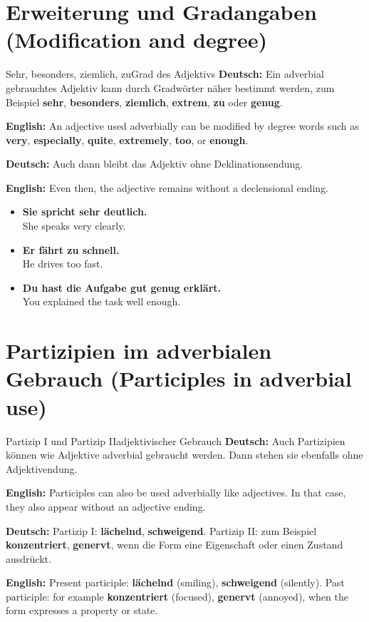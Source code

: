 \documentclass[a4paper,11pt]{article}
\newcommand{\GermanText}[1]{\textbf{Deutsch: }#1\par}
\newcommand{\EnglishText}[1]{{\small\color{SoftGray}\textbf{English: }#1\par}}
\newcommand{\ExampleItem}[2]{\item \textbf{#1}\\{\small\color{SoftGray}#2}}
\begin{document}
    \section{Erweiterung und Gradangaben \textnormal{(Modification and degree)}}

        \begin{grammarentry}{Sehr, besonders, ziemlich, zu}{Grad des Adjektivs}
            \GermanText{Ein adverbial gebrauchtes Adjektiv kann durch Gradwörter näher bestimmt werden, zum Beispiel \textbf{sehr}, \textbf{besonders}, \textbf{ziemlich}, \textbf{extrem}, \textbf{zu} oder \textbf{genug}.}
            \EnglishText{An adjective used adverbially can be modified by degree words such as \textbf{very}, \textbf{especially}, \textbf{quite}, \textbf{extremely}, \textbf{too}, or \textbf{enough}.}

            \GermanText{Auch dann bleibt das Adjektiv ohne Deklinationsendung.}
            \EnglishText{Even then, the adjective remains without a declensional ending.}
        \end{grammarentry}

        \begin{exbox}
            \begin{itemize}
                \ExampleItem{Sie spricht sehr deutlich.}{She speaks very clearly.}
                \ExampleItem{Er fährt zu schnell.}{He drives too fast.}
                \ExampleItem{Du hast die Aufgabe gut genug erklärt.}{You explained the task well enough.}
            \end{itemize}
        \end{exbox}

    \section{Partizipien im adverbialen Gebrauch \textnormal{(Participles in adverbial use)}}

        \begin{grammarentry}{Partizip I und Partizip II}{adjektivischer Gebrauch}
            \GermanText{Auch Partizipien können wie Adjektive adverbial gebraucht werden. Dann stehen sie ebenfalls ohne Adjektivendung.}
            \EnglishText{Participles can also be used adverbially like adjectives. In that case, they also appear without an adjective ending.}

            \GermanText{Partizip I: \textbf{lächelnd}, \textbf{schweigend}. Partizip II: zum Beispiel \textbf{konzentriert}, \textbf{genervt}, wenn die Form eine Eigenschaft oder einen Zustand ausdrückt.}
            \EnglishText{Present participle: \textbf{lächelnd} (smiling), \textbf{schweigend} (silently). Past participle: for example \textbf{konzentriert} (focused), \textbf{genervt} (annoyed), when the form expresses a property or state.}
        \end{grammarentry}
\end{document}
